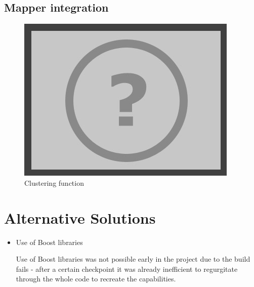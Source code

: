\subsection{Mapper integration}

\begin{figure}[h]
\begin{center}
\includegraphics[scale = 0.5]{images/placeholder.png}
\end{center}
\caption{Clustering function}
\end{figure}

\section{Alternative Solutions}

\begin{itemize}
\item{Use of Boost libraries}

Use of Boost libraries was not possible early in the project due to the build fails - after a certain checkpoint it was already inefficient to regurgitate through the whole code to recreate the capabilities.
\end{itemize}
